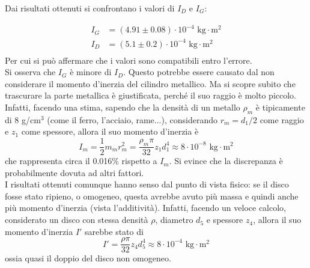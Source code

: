 
Dai risultati ottenuti si confrontano i valori di $I_D$ e $I_G$:

\begin{align*}
    I_G &= (4.91 \pm 0.08) \cdot 10^{-4} \textrm{ kg} \cdot \textrm{m}^2\\
    I_D &= (5.1 \pm 0.2) \cdot 10^{-4} \textrm{ kg} \cdot \textrm{m}^2 \\
\end{align*}
Per cui si può affermare che i valori sono compatibili entro l'errore.\\

Si osserva che $I_G$ è minore di $I_D$. Questo potrebbe essere causato dal non considerare il momento d'inerzia del cilindro metallico. Ma si scopre subito che trascurare la parte metallica è giustificata, perché il suo raggio è molto piccolo. Infatti, facendo una stima, sapendo che la densità di un metallo $\rho_{m}$ è tipicamente di 8 g/cm$^3$ (come il ferro, l'acciaio, rame...), considerando $r_m = d_1/2$ come raggio e $z_1$ come spessore, allora il suo momento d'inerzia è
$$I_m = \frac{1}{2} m_m r_m^2 = \frac{\rho_m \pi}{32} z_1 d_1^4 \approx 8 \cdot 10^{-8} \textrm{ kg} \cdot \textrm{m}^2$$
che rappresenta circa il 0.016\% rispetto a $I_m$. Si evince che la discrepanza è probabilmente dovuta ad altri fattori.\\

I risultati ottenuti comunque hanno senso dal punto di vista fisico: se il disco fosse stato ripieno, o omogeneo, questa avrebbe avuto più massa e quindi anche più momento d'inerzia (vista l'additività). Infatti, facendo un veloce calcolo, considerato un disco con stessa densità $\rho$, diametro $d_5$ e spessore $z_4$, allora il suo momento d'inerzia $I'$ sarebbe stato di
$$I' = \frac{\rho \pi}{32} z_4 d_5^4 \approx 8 \cdot 10^{-4} \textrm{ kg} \cdot \textrm{m}^2$$
ossia quasi il doppio del disco non omogeneo.
